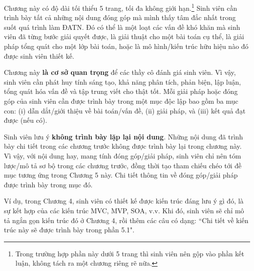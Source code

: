\documentclass[../DoAn.tex]{subfiles}
\begin{document}
Chương này có độ dài tối thiểu 5 trang, tối đa không giới hạn.\footnote{Trong trường hợp phần này dưới 5 trang thì sinh viên nên gộp vào phần kết luận, không tách ra một chương riêng rẽ nữa.} Sinh viên cần trình bày tất cả những nội dung đóng góp mà mình thấy tâm đắc nhất trong suốt quá trình làm ĐATN. Đó có thể là một loạt các vấn đề khó khăn mà sinh viên đã từng bước giải quyết được, là giải thuật cho một bài toán cụ thể, là giải pháp tổng quát cho một lớp bài toán, hoặc là mô hình/kiến trúc hữu hiệu nào đó được sinh viên thiết kế.

Chương này \textbf{là cơ sở quan trọng} để các thầy cô đánh giá sinh viên. Vì vậy, sinh viên cần phát huy tính sáng tạo, khả năng phân tích, phản biện, lập luận, tổng quát hóa vấn đề và tập trung viết cho thật tốt.
Mỗi giải pháp hoặc đóng góp của sinh viên cần được trình bày trong một mục độc lập bao gồm ba mục con: (i) dẫn dắt/giới thiệu về bài toán/vấn đề, (ii) giải pháp, và (iii) kết quả đạt được (nếu có).

Sinh viên lưu ý \textbf{không trình bày lặp lại nội dung}. Những nội dung đã trình bày chi tiết trong các chương trước không được trình bày lại trong chương này. Vì vậy, với nội dung hay, mang tính đóng góp/giải pháp, sinh viên chỉ nên tóm lược/mô tả sơ bộ trong các chương trước, đồng thời tạo tham chiếu chéo tới đề mục tương ứng trong Chương 5 này. Chi tiết thông tin về đóng góp/giải pháp được trình bày trong mục đó.

Ví dụ, trong Chương 4, sinh viên có thiết kế được kiến trúc đáng lưu ý gì đó, là sự kết hợp của các kiến trúc MVC, MVP, SOA, v.v. Khi đó, sinh viên sẽ chỉ mô tả ngắn gọn kiến trúc đó ở Chương 4, rồi thêm các câu có dạng: ``Chi tiết về kiến trúc này sẽ được trình bày trong phần 5.1". 
\end{document}
